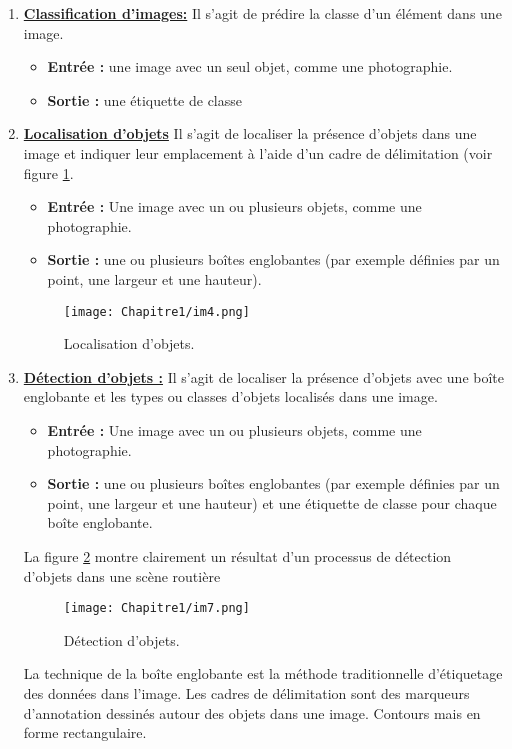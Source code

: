 \begin{enumerate}
\item \underline{\textbf{Classification d'images:}}
Il s'agit de prédire la classe d'un élément dans une image. 
    
\begin{itemize}
\item \textbf{Entrée : }une image avec un seul objet, comme une photographie.
         
\item \textbf{Sortie :} une étiquette de classe 
\end{itemize}

\item \underline{\textbf{Localisation d'objets}}
Il s'agit de localiser la présence d'objets dans une image et indiquer leur emplacement à l'aide d'un cadre de délimitation (voir figure \ref{im4}.
     
\begin{itemize}
\item  \textbf{Entrée :} Une image avec un ou plusieurs objets, comme une photographie.
\item  \textbf{Sortie :} une ou plusieurs boîtes englobantes (par exemple définies par un point, une largeur et une hauteur).
\end{itemize}

\begin{figure}[H]
\centering
\texttt{[image: Chapitre1/im4.png]}
\caption{Localisation d'objets.}
\label{im4}
\end{figure}

\item \underline{\textbf{Détection d'objets :}}
Il s'agit de localiser la présence d'objets avec une boîte englobante et les types ou classes d'objets localisés dans une image. 

\begin{itemize}
\item  \textbf{Entrée : }Une image avec un ou plusieurs objets, comme une photographie.
\item \textbf{Sortie :} une ou plusieurs boîtes englobantes (par exemple définies par un point, une largeur et une hauteur) et une étiquette de classe pour chaque boîte englobante.   
 \end{itemize}
 La figure \ref{im7} montre clairement un résultat d'un processus de détection d'objets dans une scène routière

\begin{figure}[H]
\centering
\texttt{[image: Chapitre1/im7.png]}
\caption {Détection d'objets.}
\label{im7}
\end{figure}
     
La technique de la boîte englobante est la méthode traditionnelle d'étiquetage des données dans l'image. Les cadres de délimitation sont des marqueurs d'annotation dessinés autour des objets dans une image. Contours mais en forme rectangulaire. 
\end{enumerate}

